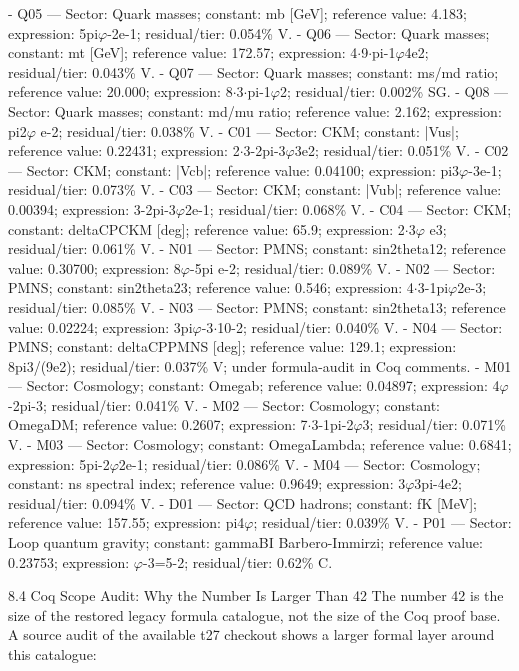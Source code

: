   - Q05 --- Sector: Quark masses; constant: mb [GeV]; reference value: 4.183; expression:
  5pi$\varphi$-2e-1; residual/tier: 0.054\% V.
  - Q06 --- Sector: Quark masses; constant: mt [GeV]; reference value: 172.57; expression:
  4$\cdot$9$\cdot$pi-1$\varphi$4e2; residual/tier: 0.043\% V.
  - Q07 --- Sector: Quark masses; constant: ms/md ratio; reference value: 20.000;
  expression: 8$\cdot$3$\cdot$pi-1$\varphi$2; residual/tier: 0.002\% SG.
  - Q08 --- Sector: Quark masses; constant: md/mu ratio; reference value: 2.162;
  expression: pi2$\varphi$ e-2; residual/tier: 0.038\% V.
  - C01 --- Sector: CKM; constant: |Vus|; reference value: 0.22431; expression:
  2$\cdot$3-2pi-3$\varphi$3e2; residual/tier: 0.051\% V.
  - C02 --- Sector: CKM; constant: |Vcb|; reference value: 0.04100; expression: pi3$\varphi$-3e-1;
  residual/tier: 0.073\% V.
  - C03 --- Sector: CKM; constant: |Vub|; reference value: 0.00394; expression:
  3-2pi-3$\varphi$2e-1; residual/tier: 0.068\% V.
  - C04 --- Sector: CKM; constant: deltaCPCKM [deg]; reference value: 65.9; expression:
  2$\cdot$3$\varphi$ e3; residual/tier: 0.061\% V.
  - N01 --- Sector: PMNS; constant: sin2theta12; reference value: 0.30700; expression:
  8$\varphi$-5pi e-2; residual/tier: 0.089\% V.
  - N02 --- Sector: PMNS; constant: sin2theta23; reference value: 0.546; expression:
  4$\cdot$3-1pi$\varphi$2e-3; residual/tier: 0.085\% V.
  - N03 --- Sector: PMNS; constant: sin2theta13; reference value: 0.02224; expression:
  3pi$\varphi$-3$\cdot$10-2; residual/tier: 0.040\% V.
  - N04 --- Sector: PMNS; constant: deltaCPPMNS [deg]; reference value: 129.1;
  expression: 8pi3/(9e2); residual/tier: 0.037\% V; under formula-audit in Coq comments.
  - M01 --- Sector: Cosmology; constant: Omegab; reference value: 0.04897; expression:
  4$\varphi$-2pi-3; residual/tier: 0.041\% V.
  - M02 --- Sector: Cosmology; constant: OmegaDM; reference value: 0.2607; expression:
  7$\cdot$3-1pi-2$\varphi$3; residual/tier: 0.071\% V.
  - M03 --- Sector: Cosmology; constant: OmegaLambda; reference value: 0.6841;
  expression: 5pi-2$\varphi$2e-1; residual/tier: 0.086\% V.
  - M04 --- Sector: Cosmology; constant: ns spectral index; reference value: 0.9649;
  expression: 3$\varphi$3pi-4e2; residual/tier: 0.094\% V.
  - D01 --- Sector: QCD hadrons; constant: fK [MeV]; reference value: 157.55; expression:
  pi4$\varphi$; residual/tier: 0.039\% V.
  - P01 --- Sector: Loop quantum gravity; constant: gammaBI Barbero-Immirzi; reference
  value: 0.23753; expression: $\varphi$-3=5-2; residual/tier: 0.62\% C.

  8.4 Coq Scope Audit: Why the Number Is Larger Than 42
  The number 42 is the size of the restored legacy formula catalogue, not the size of the
  Coq proof base. A source audit of the available t27 checkout shows a larger formal layer
  around this catalogue:


